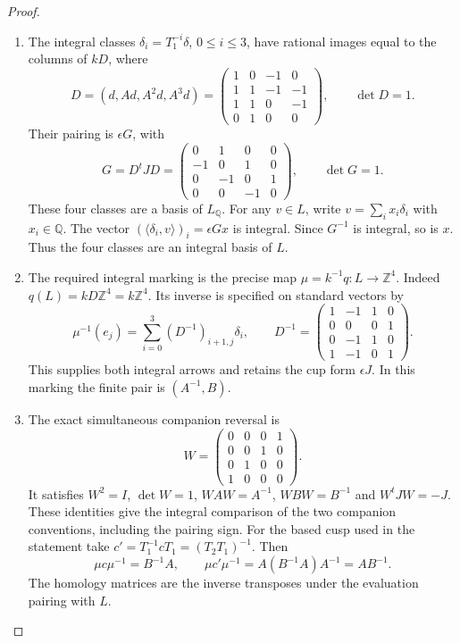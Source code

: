 \begin{proof}
\begin{enumerate}[label={$\langle1\rangle$\arabic*.}]
\item The integral classes
$\delta_i=T_1^{-i}\delta$, $0\leq i\leq3$, have rational images
equal to the columns of $kD$, where
\[
 D=(d,Ad,A^2d,A^3d)=
 \begin{pmatrix}1&0&-1&0\\1&1&-1&-1\\1&1&0&-1\\0&1&0&0\end{pmatrix},
 \qquad \det D=1.
\]
Their pairing is $\epsilon G$, with
\[
 G=D^tJD=
 \begin{pmatrix}0&1&0&0\\-1&0&1&0\\0&-1&0&1\\0&0&-1&0\end{pmatrix},
 \qquad \det G=1.
\]
These four classes are a basis of $L_{\mathbb Q}$. For any $v\in L$,
write $v=\sum_i x_i\delta_i$ with $x_i\in\mathbb Q$.
The vector $(\langle\delta_i,v\rangle)_i=\epsilon Gx$ is integral.
Since $G^{-1}$ is integral, so is $x$. Thus the four classes are an
integral basis of $L$.

\item The required integral marking is the precise map
$\mu=k^{-1}q:L\longrightarrow\mathbb Z^4$.
Indeed $q(L)=kD\mathbb Z^4=k\mathbb Z^4$. Its inverse is specified
on standard vectors by
\[
 \mu^{-1}(e_j)=\sum_{i=0}^3(D^{-1})_{i+1,j}\delta_i,
 \qquad
 D^{-1}=\begin{pmatrix}1&-1&1&0\\0&0&0&1\\0&-1&1&0\\1&-1&0&1\end{pmatrix}.
\]
This supplies both integral arrows and retains the cup form
$\epsilon J$. In this marking the finite pair is $(A^{-1},B)$.

\item The exact simultaneous companion reversal is
\[
 W=\begin{pmatrix}0&0&0&1\\0&0&1&0\\0&1&0&0\\1&0&0&0\end{pmatrix}.
\]
It satisfies $W^2=I$, $\det W=1$, $WAW=A^{-1}$,
$WBW=B^{-1}$ and $W^tJW=-J$. These identities give the integral comparison of the two companion conventions, including
the pairing sign. For the based cusp used in the statement take
$c'=T_1^{-1}cT_1=(T_2T_1)^{-1}$. Then
\[
 \mu c\mu^{-1}=B^{-1}A,\qquad
 \mu c'\mu^{-1}=A(B^{-1}A)A^{-1}=AB^{-1}.
\]
The homology matrices are the inverse transposes under the evaluation pairing with $L$.


\end{enumerate}
\end{proof}
